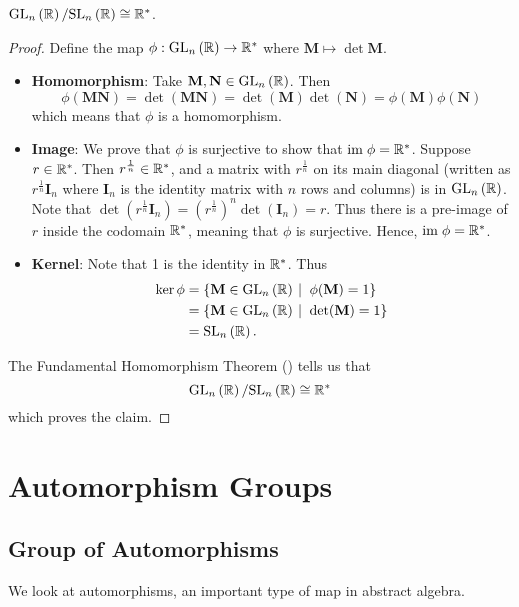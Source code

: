 \begin{proposition}
    $\mathrm{GL}_{n}\left(\mathbb{R}\right) / \mathrm{SL}_{n}\left(\mathbb{R}\right) \cong \mathbb{R}^\ast$.
\end{proposition}
\begin{proof}
    Define the map $\phi: \mathrm{GL}_{n}\left(\mathbb{R}\right) \to \mathbb{R}^\ast$ where $\textbf{M} \mapsto \det\textbf{M}$.
	\begin{itemize}
	    \item \textbf{Homomorphism}: Take $\textbf{M}, \textbf{N} \in \mathrm{GL}_{n}\left(\mathbb{R}\right)$. Then
	    \[
	        \phi(\textbf{MN}) = \det(\textbf{MN}) = \det(\textbf{M})\det(\textbf{N}) = \phi(\textbf{M})\phi(\textbf{N})
	    \]
	    which means that $\phi$ is a homomorphism.

	    \item \textbf{Image}: We prove that $\phi$ is surjective to show that $\mathrm{im}\; \phi = \mathbb{R}^\ast$. Suppose $r \in \mathbb{R}^\ast$. Then $r^{\frac1n} \in \mathbb{R}^\ast$, and a matrix with $r^{\frac1n}$ on its main diagonal (written as $r^{\frac1n}\textbf{I}_n$ where $\textbf{I}_n$ is the identity matrix with $n$ rows and columns) is in $\mathrm{GL}_{n}\left(\mathbb{R}\right)$. Note that $\det\left(r^{\frac1n}\textbf{I}_n\right) = \left(r^{\frac1n}\right)^n\det(\textbf{I}_n) = r$. Thus there is a pre-image of $r$ inside the codomain $\mathbb{R}^\ast$, meaning that $\phi$ is surjective. Hence, $\mathrm{im}\; \phi = \mathbb{R}^\ast$.

	    \item \textbf{Kernel}: Note that 1 is the identity in $\mathbb{R}^\ast$. Thus
	    \begin{align*}
	        \ker\phi &= \{\textbf{M} \in \GL{n}{\R} \vert \phi(\textbf{M}) = 1\} \\
	        &= \{\textbf{M} \in \GL{n}{\R} \vert \det(\textbf{M}) = 1\}\\
	        &= \SL{n}{\R}.
	    \end{align*}
	\end{itemize}
	The Fundamental Homomorphism Theorem () tells us that
	\[
	    \mathrm{GL}_{n}\left(\mathbb{R}\right) / \mathrm{SL}_{n}\left(\mathbb{R}\right) \cong \mathbb{R}^\ast
	\]
	which proves the claim.
\end{proof}

\section{Automorphism Groups}\label{section-automorphism-groups}
\subsection{Group of Automorphisms}
We look at automorphisms, an important type of map in abstract algebra.

